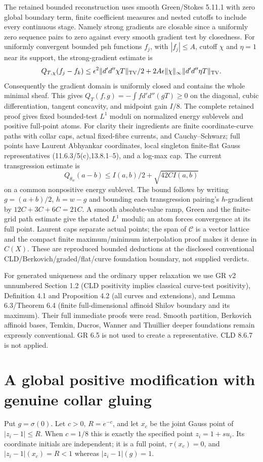 \documentclass[11pt]{article}
\newcommand{\DD}{d'd''}
\newcommand{\C}{\mathcal C}
\begin{document}
The retained bounded reconstruction uses smooth Green/Stokes 5.11.1
with zero global boundary term, finite coefficient measures and nested
cutoffs to include every continuous stage. Namely strong gradients
are closable since a uniformly zero sequence pairs to zero against every
smooth gradient test by closedness. For uniformly convergent bounded
psh functions $f_j$, with $|f_j|\le A$, cutoff $\chi$ and $\eta=1$
near its support, the strong-gradient estimate is
\[
 Q_{T,\chi}(f_j-f_k)\le \epsilon^2\|\DD\chi T\|_{\rm TV}/2
 +2A\epsilon\|\chi\|_\infty\|\DD\eta T\|_{\rm TV}.
\]
Consequently the gradient domain is uniformly closed and contains the
whole minimal sheaf. This gives $Q_T(f,g)=-\int f\DD(gT)\ge0$
on the diagonal, cubic differentiation, tangent concavity, and midpoint
gain $I/8$. The complete retained proof gives fixed bounded-test $L^1$
moduli on normalized energy sublevels and positive full-point atoms.
For clarity their ingredients are finite coordinate-curve paths with
collar caps, actual fixed-fibre currents, and Cauchy--Schwarz; full
points have Laurent Abhyankar coordinates, local singleton finite-flat
Gauss representatives (11.6.3/5(c),13.8.1--5), and a log-max cap.
The current transgression estimate is
\[
 Q_{\theta_w}(a-b)\le I(a,b)/2+\sqrt{42C I(a,b)}
\]
on a common nonpositive energy sublevel. The bound follows by writing
$g=(a+b)/2$, $h=w-g$ and bounding each transgression pairing's
$h$-gradient by $12C+3C+6C=21C$. A smooth absolute-value ramp,
Green and the finite-grid path estimate give the stated $L^1$ moduli;
an atom forces convergence at its full point. Laurent caps separate
actual points; the span of $\C$ is a vector lattice and the compact
finite maximum/minimum interpolation proof makes it dense in $C(X)$.
These are reproduced bounded deductions at the disclosed conventional
CLD/Berkovich/graded/flat/curve foundation boundary, not supplied verdicts.

For generated uniqueness and the ordinary upper relaxation we use GR v2
unnumbered Section 1.2 (CLD positivity implies classical curve-test
positivity), Definition 4.1 and Proposition 4.2 (all curves and extensions),
and Lemma 6.3/Theorem 6.4 (finite full-dimensional affinoid Shilov boundary
and its maximum). Their full immediate proofs were read. Smooth partition,
Berkovich affinoid bases, Temkin, Ducros, Wanner and Thuillier deeper
foundations remain expressly conventional. GR 6.5 is not used to create
a representative. CLD 8.6.7 is not applied.

\section{A global positive modification with genuine collar gluing}
Put $g=\sigma(0)$. Let $c>0$, $R=e^{-c}$, and let $x_c$ be the
joint Gauss point of $|z_i-1|\le R$. When $c=1/8$ this is exactly
the specified point $z_i=1+s u_i$. Its coordinate initials are independent;
it is a full point, $\tau(x_c)=0$, and $|z_i-1|(x_c)=R<1$
whereas $|z_i-1|(g)=1$.
\end{document}
